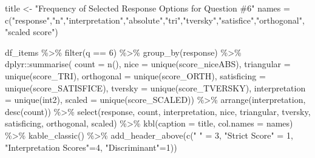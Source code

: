 \documentclass[
  letterpaper,
  DIV=11,
  numbers=noendperiod]{scrreprt}
\newenvironment{Shaded}{\begin{snugshade}}{\end{snugshade}}
\newcommand{\AttributeTok}[1]{\textcolor[rgb]{0.40,0.45,0.13}{#1}}
\newcommand{\DecValTok}[1]{\textcolor[rgb]{0.68,0.00,0.00}{#1}}
\newcommand{\FunctionTok}[1]{\textcolor[rgb]{0.28,0.35,0.67}{#1}}
\newcommand{\NormalTok}[1]{\textcolor[rgb]{0.00,0.23,0.31}{#1}}
\newcommand{\OtherTok}[1]{\textcolor[rgb]{0.00,0.23,0.31}{#1}}
\newcommand{\SpecialCharTok}[1]{\textcolor[rgb]{0.37,0.37,0.37}{#1}}
\newcommand{\StringTok}[1]{\textcolor[rgb]{0.13,0.47,0.30}{#1}}
\begin{document}
\begin{Shaded}
\begin{Highlighting}[]
\NormalTok{title }\OtherTok{\textless{}{-}} \StringTok{"Frequency of Selected Response Options for Question \#6"}
\NormalTok{names }\OtherTok{=} \FunctionTok{c}\NormalTok{(}\StringTok{"response"}\NormalTok{,}\StringTok{"n"}\NormalTok{,}\StringTok{"interpretation"}\NormalTok{,}\StringTok{"absolute"}\NormalTok{,}\StringTok{"tri"}\NormalTok{,}\StringTok{"tversky"}\NormalTok{,}\StringTok{"satisfice"}\NormalTok{,}\StringTok{"orthogonal"}\NormalTok{, }\StringTok{"scaled score"}\NormalTok{)}

\NormalTok{df\_items }\SpecialCharTok{\%\textgreater{}\%} \FunctionTok{filter}\NormalTok{(q }\SpecialCharTok{==} \DecValTok{6}\NormalTok{) }\SpecialCharTok{\%\textgreater{}\%} \FunctionTok{group\_by}\NormalTok{(response) }\SpecialCharTok{\%\textgreater{}\%}
\NormalTok{  dplyr}\SpecialCharTok{::}\FunctionTok{summarise}\NormalTok{( }\AttributeTok{count =} \FunctionTok{n}\NormalTok{(),}
                    \AttributeTok{nice =} \FunctionTok{unique}\NormalTok{(score\_niceABS),}
                    \AttributeTok{triangular =} \FunctionTok{unique}\NormalTok{(score\_TRI),}
                    \AttributeTok{orthogonal =}  \FunctionTok{unique}\NormalTok{(score\_ORTH),}
                    \AttributeTok{satisficing =}  \FunctionTok{unique}\NormalTok{(score\_SATISFICE),}
                    \AttributeTok{tversky =} \FunctionTok{unique}\NormalTok{(score\_TVERSKY),}
                    \AttributeTok{interpretation =} \FunctionTok{unique}\NormalTok{(int2),}
                    \AttributeTok{scaled =} \FunctionTok{unique}\NormalTok{(score\_SCALED)) }\SpecialCharTok{\%\textgreater{}\%}
  \FunctionTok{arrange}\NormalTok{(interpretation, }\FunctionTok{desc}\NormalTok{(count)) }\SpecialCharTok{\%\textgreater{}\%}
  \FunctionTok{select}\NormalTok{(response, count, interpretation, nice,}
\NormalTok{         triangular, tversky, satisficing, orthogonal, scaled) }\SpecialCharTok{\%\textgreater{}\%}
  \FunctionTok{kbl}\NormalTok{(}\AttributeTok{caption =}\NormalTok{ title, }\AttributeTok{col.names =}\NormalTok{ names) }\SpecialCharTok{\%\textgreater{}\%}  \FunctionTok{kable\_classic}\NormalTok{() }\SpecialCharTok{\%\textgreater{}\%}
  \FunctionTok{add\_header\_above}\NormalTok{(}\FunctionTok{c}\NormalTok{(}\StringTok{" "} \OtherTok{=} \DecValTok{3}\NormalTok{, }\StringTok{"Strict Score"} \OtherTok{=} \DecValTok{1}\NormalTok{, }\StringTok{"Interpretation Scores"}\OtherTok{=}\DecValTok{4}\NormalTok{, }\StringTok{"Discriminant"}\OtherTok{=}\DecValTok{1}\NormalTok{)) }
\end{Highlighting}
\end{Shaded}
\end{document}
